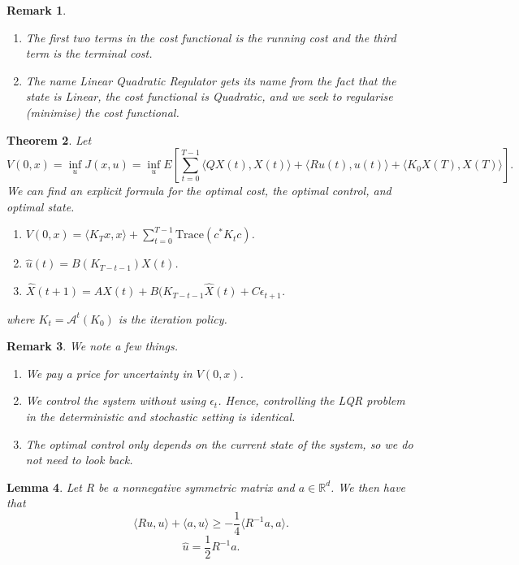 \documentclass[twoside]{article}
\newcounter{lecnum}
\newtheorem{theorem}{Theorem}[lecnum]
\newtheorem{lemma}[theorem]{Lemma}
\newtheorem{remark}[theorem]{Remark}
\begin{document}
\begin{remark}
\begin{enumerate}
\item The first two terms in the cost functional is the running cost and the third term is the terminal cost.
\item The name Linear Quadratic Regulator gets its name from the fact that the state is Linear, the cost functional is Quadratic, and we seek to regularise (minimise) the cost functional.
\end{enumerate}
\end{remark}

\begin{theorem}Let 
$$
V(0,x) = \inf_{u}J(x,u) = \inf_{u}E[\sum_{t=0}^{T-1}\langle QX(t), X(t)\rangle + \langle Ru(t), u(t) \rangle + \langle K_0X(T), X(T)\rangle].
$$
\newline 
We can find an explicit formula for the optimal cost, the optimal control, and optimal state.
\newline
\begin{enumerate}
\item $V(0,x) = \langle K_Tx,x \rangle + \sum_{t=0}^{T-1}\text{Trace}(c^*K_tc)$.
\item $\hat{u}(t) = B(K_{T-t-1})X(t)$.
\item $\hat{X}(t+1) = A\hat{X}(t) + B(K_{T-t-1}\hat{X}(t) + C\epsilon_{t+1}$.
\end{enumerate}
where $K_t = \mathcal{A}^t(K_0)$ is the iteration policy. 
\end{theorem}
\begin{remark} We note a few things.
\begin{enumerate}
\item We pay a price for uncertainty in $V(0,x)$.
\item We control the system without using $\epsilon_t$. Hence, controlling the LQR problem in the deterministic and stochastic setting is identical.
\item The optimal control only depends on the current state of the system, so we do not need to look back.
\end{enumerate}
\end{remark}

\begin{lemma}Let R be a nonnegative symmetric matrix and $a \in \mathbb{R}^d$. We then have that 
$$
\langle Ru,u \rangle + \langle a,u \rangle \geq -\frac{1}{4}\langle R^{-1}a, a \rangle.
$$
$$
\hat{u} = \frac{1}{2}R^{-1}a.
$$
\end{lemma}
\end{document}
